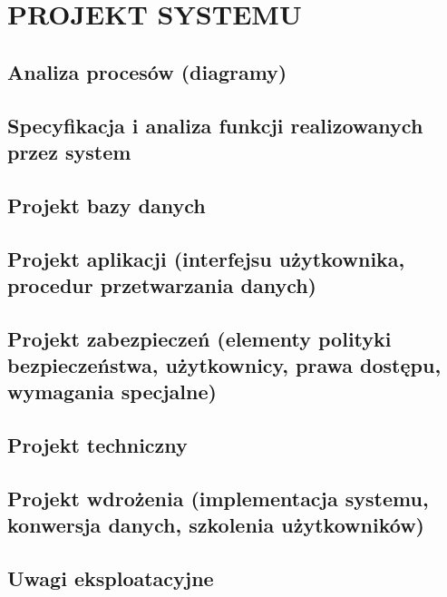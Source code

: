 \section{PROJEKT SYSTEMU}

\subsection{Analiza procesów (diagramy)}


\subsection{Specyfikacja i analiza funkcji realizowanych przez system}


\subsection{Projekt bazy danych}


\subsection{Projekt aplikacji (interfejsu użytkownika, procedur przetwarzania danych)}


\subsection{Projekt zabezpieczeń (elementy polityki bezpieczeństwa, użytkownicy, prawa dostępu, wymagania specjalne)}


\subsection{Projekt techniczny}


\subsection{Projekt wdrożenia (implementacja systemu, konwersja danych, szkolenia użytkowników)}


\subsection{Uwagi eksploatacyjne}

\newpage
